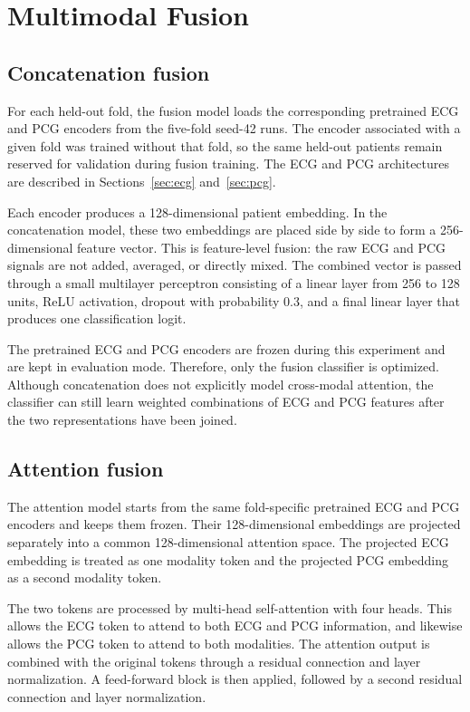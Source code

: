 \documentclass[11pt,a4paper]{article}
\begin{document}
\section{Multimodal Fusion}
\label{sec:fusion}

\subsection{Concatenation fusion}

For each held-out fold, the fusion model loads the corresponding pretrained
ECG and PCG encoders from the five-fold seed-42 runs. The encoder associated
with a given fold was trained without that fold, so the same held-out patients
remain reserved for validation during fusion training. The ECG and PCG
architectures are described in Sections~\ref{sec:ecg} and~\ref{sec:pcg}.

Each encoder produces a 128-dimensional patient embedding. In the
concatenation model, these two embeddings are placed side by side to form a
256-dimensional feature vector. This is feature-level fusion: the raw ECG and
PCG signals are not added, averaged, or directly mixed. The combined vector is
passed through a small multilayer perceptron consisting of a linear layer from
256 to 128 units, ReLU activation, dropout with probability 0.3, and a final
linear layer that produces one classification logit.

The pretrained ECG and PCG encoders are frozen during this experiment and are
kept in evaluation mode. Therefore, only the fusion classifier is optimized.
Although concatenation does not explicitly model cross-modal attention, the
classifier can still learn weighted combinations of ECG and PCG features after
the two representations have been joined.

\subsection{Attention fusion}
The attention model starts from the same fold-specific pretrained ECG and PCG
encoders and keeps them frozen. Their 128-dimensional embeddings are projected
separately into a common 128-dimensional attention space. The projected ECG
embedding is treated as one modality token and the projected PCG embedding as
a second modality token.

The two tokens are processed by multi-head self-attention with four heads.
This allows the ECG token to attend to both ECG and PCG information, and
likewise allows the PCG token to attend to both modalities. The attention
output is combined with the original tokens through a residual connection and
layer normalization. A feed-forward block is then applied, followed by a
second residual connection and layer normalization.
\end{document}

